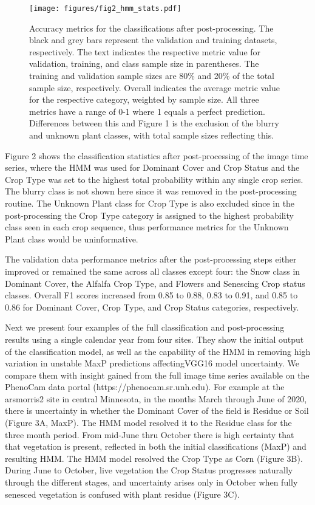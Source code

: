 \documentclass{article}
\begin{document}
\begin{figure}[!ht]
    \centering
    \texttt{[image: figures/fig2\_hmm\_stats.pdf]}
    \caption{Accuracy metrics for the classifications after post-processing. The black and grey bars represent the validation and training datasets, respectively. The text indicates the respective metric value for validation, training, and class sample size in parentheses. The training and validation sample sizes are 80\% and 20\% of the total sample size, respectively. Overall indicates the average metric value for the respective category, weighted by sample size. All three metrics have a range of 0-1 where 1 equals a perfect prediction. Differences between this and Figure 1 is the exclusion of the blurry and unknown plant classes, with total sample sizes reflecting this.}
    \label{fig2}
\end{figure}

Figure 2 shows the classification statistics after post-processing of the image time series, where the HMM was used for Dominant Cover and Crop Status and the Crop Type was set to the highest total probability within any single crop series. The blurry class is not shown here since it was removed in the post-processing routine. The Unknown Plant class for Crop Type is also excluded since in the post-processing the Crop Type category is assigned to the highest probability class seen in each crop sequence, thus performance metrics for the Unknown Plant class would be uninformative. 

The validation data performance metrics after the post-processing steps either improved or remained the same across all classes except four: the Snow class in Dominant Cover, the Alfalfa Crop Type, and Flowers and Senescing Crop status classes. Overall F1 scores increased from 0.85 to 0.88, 0.83 to 0.91, and 0.85 to 0.86 for Dominant Cover, Crop Type, and Crop Status categories, respectively. 

Next we present four examples of the full classification and post-processing results using a single calendar year from four sites. They show the initial output of the classification model, as well as the capability of the HMM in removing high variation in unstable MaxP predictions affectingVGG16 model uncertainty. We compare them with insight gained from the full image time series available on the PhenoCam data portal (https://phenocam.sr.unh.edu). For example at the arsmorris2 site in central Minnesota, in the months March through June of 2020, there is uncertainty in whether the Dominant Cover of the field is Residue or Soil (Figure 3A, MaxP). The HMM model resolved it to the Residue class for the three month period. From mid-June thru October there is high certainty that that vegetation is present, reflected in both the initial classifications (MaxP) and resulting HMM. The HMM model resolved the Crop Type as Corn (Figure 3B). During June to October, live vegetation the Crop Status progresses naturally through the different stages, and uncertainty arises only in October when fully senesced vegetation is confused with plant residue (Figure 3C). 
\end{document}
